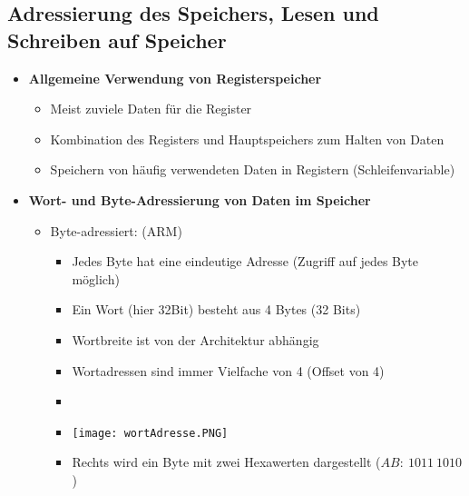 \subsection{Adressierung des Speichers, Lesen und Schreiben auf Speicher}
    \begin{itemize}
        \item \textbf{Allgemeine Verwendung von Registerspeicher}
            \begin{itemize}
                \item Meist zuviele Daten für die Register 
                \item Kombination des Registers und Hauptspeichers zum Halten von Daten 
                \item Speichern von häufig verwendeten Daten in Registern (Schleifenvariable)
            \end{itemize}
        
        \item \textbf{Wort- und Byte-Adressierung von Daten im Speicher }
            \begin{itemize}
                \item Byte-adressiert: (ARM)
                    \begin{itemize}
                        \item Jedes Byte hat eine eindeutige Adresse (Zugriff auf jedes Byte möglich)
                        \item Ein Wort (hier 32Bit) besteht aus 4 Bytes (32 Bits)
                        \item Wortbreite ist von der Architektur abhängig
                        \item Wortadressen sind immer Vielfache von 4 (Offset von 4)
                        \item[]
                        \item[] \texttt{[image: wortAdresse.PNG]}
                        \item Rechts wird ein Byte mit zwei Hexawerten dargestellt ($AB:~1011~1010$)
                    \end{itemize}
            \end{itemize}
        

\end{itemize}
